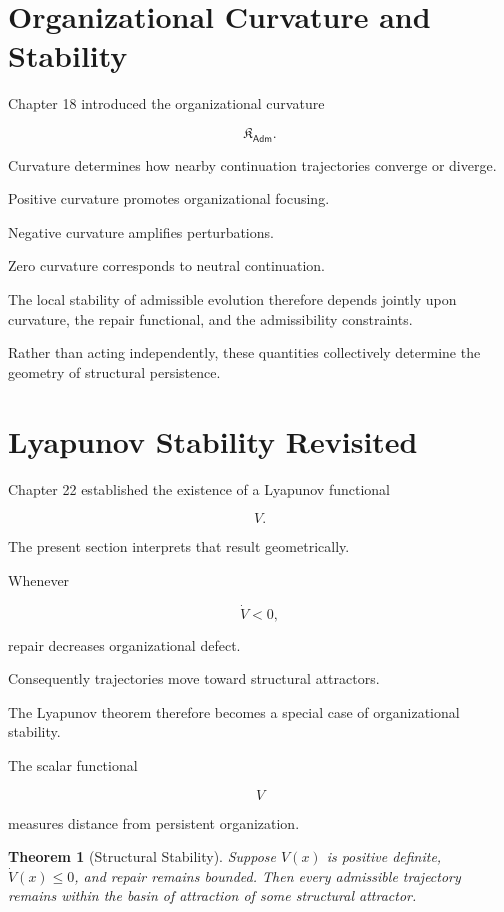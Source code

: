 \documentclass[11pt,oneside]{book}
\numberwithin{equation}{chapter}
\theoremstyle{definition}
\theoremstyle{plain}
\newtheorem{theorem}[definition]{Theorem}
\newcommand{\Adm}{\mathsf{Adm}}
\begin{document}
\section{Organizational Curvature and Stability}

Chapter 18 introduced the organizational curvature

\[
\mathfrak K_\Adm.
\]

Curvature determines how nearby continuation trajectories converge or
diverge.

Positive curvature promotes organizational focusing.

Negative curvature amplifies perturbations.

Zero curvature corresponds to neutral continuation.

The local stability of admissible evolution therefore depends jointly upon
curvature, the repair functional, and the admissibility constraints.

Rather than acting independently, these quantities collectively determine
the geometry of structural persistence.

\section{Lyapunov Stability Revisited}

Chapter 22 established the existence of a Lyapunov functional

\[
V.
\]

The present section interprets that result geometrically.

Whenever

\[
\dot V < 0,
\]

repair decreases organizational defect.

Consequently trajectories move toward structural attractors.

The Lyapunov theorem therefore becomes a special case of organizational
stability.

The scalar functional

\[
V
\]

measures distance from persistent organization.

\begin{theorem}[Structural Stability]
Suppose \(V(x)\) is positive definite, \(\dot V(x)\le 0\), and repair
remains bounded. Then every admissible trajectory remains within the basin
of attraction of some structural attractor.
\end{theorem}
\end{document}
